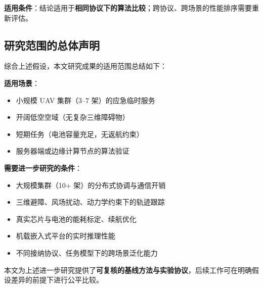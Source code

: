 \textbf{适用条件}：结论适用于\textbf{相同协议下的算法比较}；跨协议、跨场景的性能排序需要重新评估。

\subsection{研究范围的总体声明}
\label{sec:overall-scope}

综合上述假设，本文研究成果的适用范围总结如下：

\textbf{适用场景}：
\begin{itemize}
    \item 小规模 UAV 集群（3--7 架）的应急临时服务
    \item 开阔低空空域（无复杂三维障碍物）
    \item 短期任务（电池容量充足，无返航约束）
    \item 服务器端或边缘计算节点的算法验证
\end{itemize}

\textbf{需要进一步研究的条件}：
\begin{itemize}
    \item 大规模集群（10+ 架）的分布式协调与通信开销
    \item 三维避障、风场扰动、动力学约束下的轨迹跟踪
    \item 真实芯片与电池的能耗标定、续航优化
    \item 机载嵌入式平台的实时推理性能
    \item 不同接纳协议、任务模型下的跨场景泛化能力
\end{itemize}

本文为上述进一步研究提供了\textbf{可复核的基线方法与实验协议}，后续工作可在明确假设差异的前提下进行公平比较。
